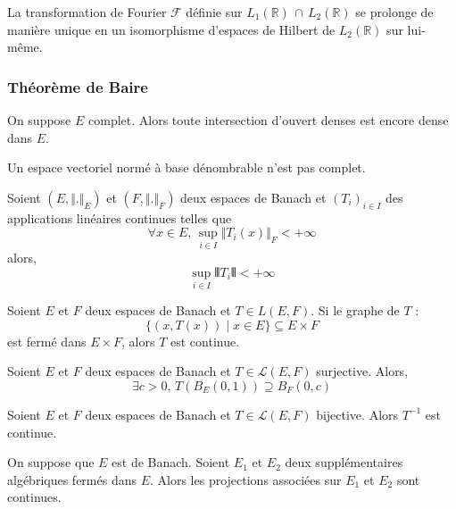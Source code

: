 
  \begin{application}
    La transformation de Fourier $\mathcal{F}$ définie sur $L_1(\mathbb{R}) \, \cap \, L_2(\mathbb{R})$ se prolonge de manière unique en un isomorphisme d'espaces de Hilbert de $L_2(\mathbb{R})$ sur lui-même.
  \end{application}

  \subsubsection{Théorème de Baire}


  \begin{theorem}[Baire]
    On suppose $E$ complet. Alors toute intersection d'ouvert denses est encore dense dans $E$.
  \end{theorem}


  \begin{application}
    Un espace vectoriel normé à base dénombrable n'est pas complet.
  \end{application}


  \begin{application}
    Soient $(E, \Vert . \Vert_E)$ et $(F, \Vert . \Vert_F)$ deux espaces de Banach et $(T_i)_{i \in I}$ des applications linéaires continues telles que
    \[ \forall x \in E, \, \sup_{i \in I} \Vert T_i(x) \Vert_F < +\infty \]
    alors,
    \[ \sup_{i \in I} \VERT T_i \VERT < +\infty \]
  \end{application}

  \begin{application}
    Soient $E$ et $F$ deux espaces de Banach et $T \in L(E,F)$. Si le graphe de $T$ :
    \[ \{ (x, T(x)) \mid x \in E \} \subseteq E \times F \]
    est fermé dans $E \times F$, alors $T$ est continue.
  \end{application}

  \begin{application}
    Soient $E$ et $F$ deux espaces de Banach et $T \in \mathcal{L}(E,F)$ surjective. Alors,
    \[ \exists c > 0, \, T\left(B_E(0,1)\right) \supseteq B_F(0,c) \]
  \end{application}

  \begin{corollary}
    Soient $E$ et $F$ deux espaces de Banach et $T \in \mathcal{L}(E,F)$ bijective. Alors $T^{-1}$ est continue.
  \end{corollary}

  \begin{corollary}
    On suppose que $E$ est de Banach. Soient $E_1$ et $E_2$ deux supplémentaires algébriques fermés dans $E$. Alors les projections associées sur $E_1$ et $E_2$ sont continues.
  \end{corollary}

